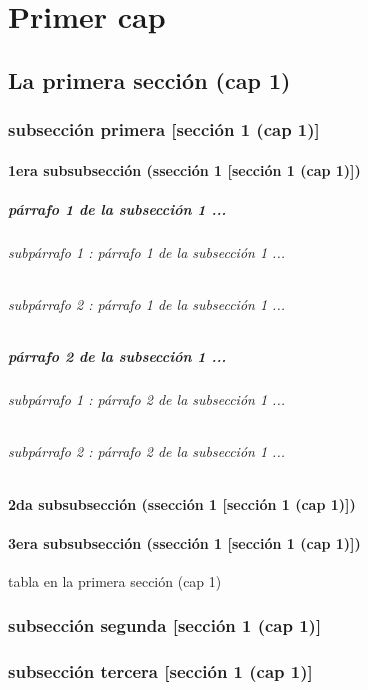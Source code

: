 \documentclass[12pt,a4paper]{report}
\begin{document}
\tableofcontents

\listoffigures

\listoftables



\chapter{Primer cap}
\section{La primera sección (cap 1)}
\subsection{subsección primera [sección 1 (cap 1)]}
\subsubsection{1era subsubsección (ssección 1 [sección 1 (cap 1)])}
\paragraph{párrafo 1 de la subsección 1 ...}
\subparagraph{subpárrafo 1 : párrafo 1 de la subsección 1 ...}
\subparagraph{subpárrafo 2 : párrafo 1 de la subsección 1 ...}
\paragraph{párrafo 2 de la subsección 1 ...}
\subparagraph{subpárrafo 1 : párrafo 2 de la subsección 1 ...}
\subparagraph{subpárrafo 2 : párrafo 2 de la subsección 1 ...}
\subsubsection{2da subsubsección (ssección 1 [sección 1 (cap 1)])}
\subsubsection{3era subsubsección (ssección 1 [sección 1 (cap 1)])}
\begin{table}[H]
\caption{tabla en la primera sección (cap 1)}
\end{table}
\subsection{subsección segunda [sección 1 (cap 1)]}
\subsection{subsección tercera [sección 1 (cap 1)]}
\end{document}
